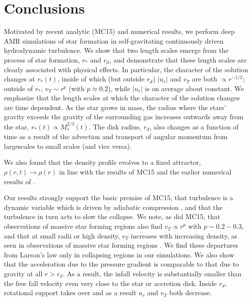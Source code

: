 \documentclass[../dissertation.tex]{subfiles}
\begin{document}
\section{Conclusions}
\label{sec:hydro_conclusions}

Motivated by recent analytic (MC15) and numerical 
\citep{2014ApJ...797...32P,2015ApJ...800...49L} results, we perform deep AMR simulations 
of star formation in self-gravitating continuously driven hydrodynamic turbulence. We show 
that two length scales emerge from the process of star formation, $r_*$ and $r_d$, and demonstrate
that these length scales are clearly associated with physical effects. 
In particular, the character of the 
solution changes at $r_*(t)$, inside of which (but outside $r_d$) $|u_r|$ and  $v_T$ are both
$\propto r^{-1/2}$; outside of $r_*$, $v_T\sim r^{p}$ (with $p\approx0.2$), while $|u_r|$ 
is on average about constant. 
We emphasize that the length scales at which the character of the solution changes are time dependent. 
As the star grows in mass, the radius where the stars' gravity exceeds the gravity of the surrounding gas increases outwards away from the star, 
$r_*(t) \propto M_*^{2/3}(t)$.
The disk radius, $r_d$, also changes as a function of time as a result of the advection and transport of angular momentum from largescales to small scales (and vice versa).

We also found that the density profile evolves
to a fixed attractor, $\rho(r,t ) \rightarrow \rho(r)$ in line with the results of MC15 and 
the earlier numerical results of \citet{2015ApJ...800...49L}. 

Our results strongly support the basic premise of MC15, that turbulence is a dynamic variable 
which is driven by adiabatic compression \citep{2012ApJ...750L..31R}, and that the turbulence
in turn acts to slow the collapse. 
We note, as did MC15, that observations of massive star forming regions also find $v_T \propto r^p$ 
with $ p \sim 0.2-0.3$, and that at small radii or high density, $v_T$  
increases with increasing density, as seen in observations of massive star forming
regions \citep{1997ApJ...476..730P}. We find these departures from Larson's law only in
collapsing regions in our simulations. We also show that the acceleration 
due to the pressure gradient is comparable to that due to gravity at all $r>r_d$. 
As a result, the infall velocity is substantially smaller than the free fall velocity
even very close to the star or accretion disk. Inside $r_d$, rotational support takes over 
and as a result $u_r$ and $v_T$ both decrease.  
\end{document}
